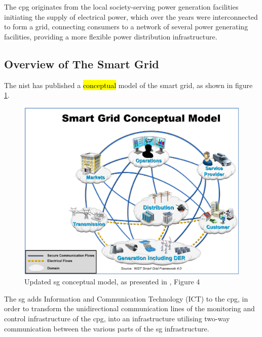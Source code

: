 The \acrlong{cpg} originates from the local society-serving power generation facilities initiating the supply of electrical power, which over the years were interconnected to form a grid, connecting consumers to a network of several power generating facilities, providing a more flexible power distribution infrastructure. 


\subsection{Overview of The Smart Grid}


The \acrfull{nist} has published a \hl{conceptual} model of the smart grid, as shown in 
figure \ref{fig:NIST-SmartGRID-ConceptualModel}.



\begin{figure}[ht]
\includegraphics[width=\linewidth]{figures/NIST-SmartGRID-ConceptualModel.png}
\caption[Smart Grid Conceptual Model]{Updated \acrlong{sg} conceptual model, as presented in \cite[p. 13]{gopstein2021nist}, Figure 4}
\label{fig:NIST-SmartGRID-ConceptualModel}
\end{figure}






The \acrlong{sg} adds Information and Communication Technology (ICT) to the \acrlong{cpg}, in order to transform the  unidirectional communication lines of the monitoring and control infrastructure of the \acrlong{cpg}, into an infrastructure utilising two-way communication between the various parts of the \acrlong{sg} infrastructure. 






